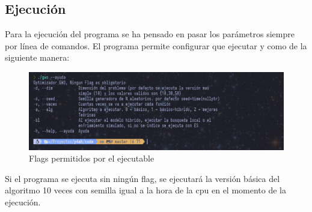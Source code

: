 \documentclass[a4paper]{report}
\begin{document}
\subsection{Ejecución}

Para la ejecución del programa se ha pensado en pasar los parámetros siempre por línea de comandos. El programa permite configurar que ejecutar y como de la siguiente manera:

\begin{figure}[H]
    \centering
    \caption{Flags permitidos por el ejecutable}
    \includegraphics[width=\textwidth]{dash_help_program.png}


\end{figure}

Si el programa se ejecuta sin ningún flag, se ejecutará la versión básica del algoritmo 10 veces con semilla igual a la hora de la cpu en el momento de la ejecución.




\end{document}
